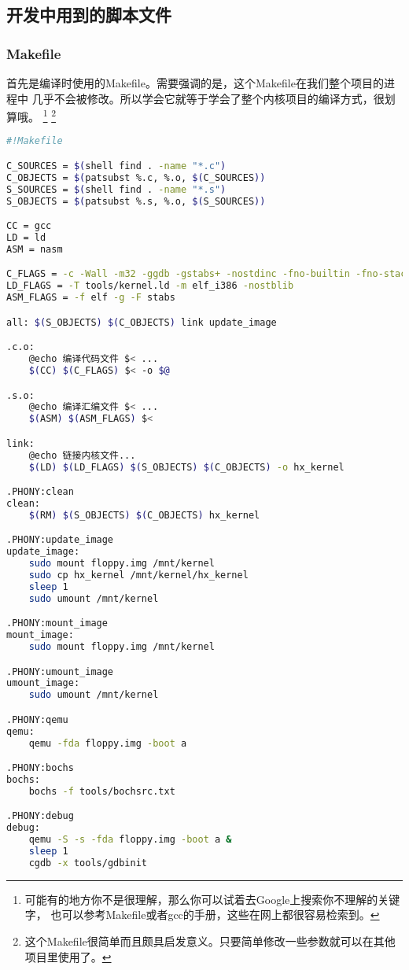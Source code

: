 \subsection{开发中用到的脚本文件}

\subsubsection{Makefile}
\par 首先是编译时使用的Makefile。需要强调的是，这个Makefile在我们整个项目的进程中\allowbreak
几乎不会被修改。所以学会它就等于学会了整个内核项目的编译方式，很划算哦。
\footnote{可能有的地方你不是很理解，那么你可以试着去Google上搜索你不理解的关键字，\allowbreak
也可以参考Makefile或者gcc的手册，这些在网上都很容易检索到。}
\footnote{这个Makefile很简单而且颇具启发意义。只要简单修改一些参数就可以在其他项目里使用了。}

\begin{lstlisting}[language = sh, caption = Makefile]
#!Makefile

C_SOURCES = $(shell find . -name "*.c")
C_OBJECTS = $(patsubst %.c, %.o, $(C_SOURCES))
S_SOURCES = $(shell find . -name "*.s")
S_OBJECTS = $(patsubst %.s, %.o, $(S_SOURCES))

CC = gcc
LD = ld
ASM = nasm

C_FLAGS = -c -Wall -m32 -ggdb -gstabs+ -nostdinc -fno-builtin -fno-stack-protector -I include
LD_FLAGS = -T tools/kernel.ld -m elf_i386 -nostblib
ASM_FLAGS = -f elf -g -F stabs

all: $(S_OBJECTS) $(C_OBJECTS) link update_image

.c.o:
	@echo 编译代码文件 $< ...
	$(CC) $(C_FLAGS) $< -o $@

.s.o:
	@echo 编译汇编文件 $< ...
	$(ASM) $(ASM_FLAGS) $<

link:
	@echo 链接内核文件...
	$(LD) $(LD_FLAGS) $(S_OBJECTS) $(C_OBJECTS) -o hx_kernel

.PHONY:clean
clean:
	$(RM) $(S_OBJECTS) $(C_OBJECTS) hx_kernel

.PHONY:update_image
update_image:
	sudo mount floppy.img /mnt/kernel
	sudo cp hx_kernel /mnt/kernel/hx_kernel
	sleep 1
	sudo umount /mnt/kernel

.PHONY:mount_image
mount_image:
	sudo mount floppy.img /mnt/kernel

.PHONY:umount_image
umount_image:
	sudo umount /mnt/kernel

.PHONY:qemu
qemu:
	qemu -fda floppy.img -boot a

.PHONY:bochs
bochs:
	bochs -f tools/bochsrc.txt

.PHONY:debug
debug:
	qemu -S -s -fda floppy.img -boot a &
	sleep 1
	cgdb -x tools/gdbinit

\end{lstlisting} 

